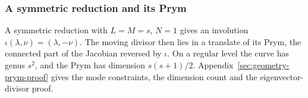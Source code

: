 \subsubsection{A symmetric reduction and its Prym}

A symmetric reduction with $L=M=s$, $N=1$ gives an involution
$\iota(\lambda,\nu)=(\lambda,-\nu)$. The moving divisor then
lies in a translate of its Prym, the connected part of the Jacobian
reversed by $\iota$. On a regular level the curve has genus $s^2$,
and the Prym has dimension $s(s+1)/2$.
Appendix~\ref{sec:geometry-prym-proof} gives the mode constraints,
the dimension count and the eigenvector-divisor proof.
